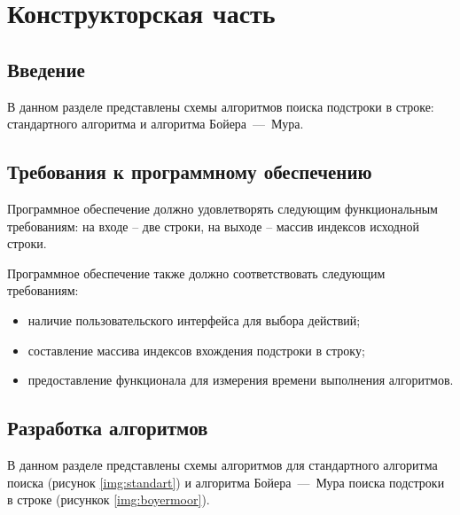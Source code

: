 \chapter{Конструкторская часть}

\section{Введение}
В данном разделе представлены схемы алгоритмов поиска подстроки в строке: стандартного алгоритма и алгоритма Бойера~---~Мура.

\section{Требования к программному обеспечению}\label{section:requirements}

Программное обеспечение должно удовлетворять следующим функциональным требованиям: на входе -- две строки, на выходе -- массив индексов исходной строки.

Программное обеспечение также должно соответствовать следующим требованиям:
\begin{itemize}[label=---]
	\item наличие пользовательского интерфейса для выбора действий;
	\item составление массива индексов вхождения подстроки в строку;
	\item предоставление функционала для измерения времени выполнения алгоритмов.
\end{itemize}

\section{Разработка алгоритмов}
В данном разделе представлены схемы алгоритмов для стандартного алгоритма поиска (рисунок \ref{img:standart}) и алгоритма Бойера~---~Мура поиска подстроки в строке (рисункок \ref{img:boyermoor}).

